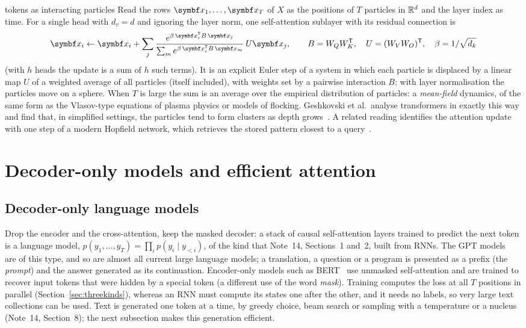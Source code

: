 \documentclass[11pt]{article}
\begin{document}
\begin{physics}{tokens as interacting particles}
Read the rows $\x_1, \dots, \x_T$ of $X$ as the positions of $T$ particles in $\mathbb{R}^d$ and the layer index as time. For a
single head with $d_v = d$ and ignoring the layer norm, one self-attention sublayer with its residual connection is
\[
  \x_i \gets \x_i + \sum_j \frac{e^{\beta\,\x_i\T B\,\x_j}}{\sum_m e^{\beta\,\x_i\T B\,\x_m}}\, U\x_j ,
  \qquad B = W_QW_K\T, \quad U = (W_VW_O)\T, \quad \beta = 1/\sqrt{d_k}
\]
(with $h$ heads the update is a sum of $h$ such terms). It is an explicit Euler step of a system in which each particle is
displaced by a linear map $U$ of a weighted average of all particles (itself included), with weights set by a pairwise
interaction $B$; with layer normalisation the particles move on a sphere. When $T$ is large the sum is an average over the empirical distribution of particles: a
\emph{mean-field} dynamics, of the same form as the Vlasov-type equations of plasma physics or models of flocking.
Geshkovski et al.\ analyse transformers in exactly this way and find that, in simplified settings, the particles tend to
form clusters as depth grows~\cite{geshkovski2023}. A related reading identifies the attention update with one step of a
modern Hopfield network, which retrieves the stored pattern closest to a query~\cite{ramsauer2021}.
\end{physics}

\section{Decoder-only models and efficient attention}\label{sec:modern}

\subsection{Decoder-only language models}\label{sec:decoderonly}

Drop the encoder and the cross-attention, keep the masked decoder: a stack of causal self-attention layers trained to
predict the next token is a language model, $p(y_1, \dots, y_T) = \prod_i p(y_i \mid y_{<i})$, of the kind that Note~14,
Sections~1 and~2, built from RNNs. The GPT models~\cite{radford2019,brown2020} are of this type, and so are almost all current large language models;
a translation, a question or a program is presented as a prefix (the \emph{prompt}) and the answer generated as its
continuation. Encoder-only models such as BERT~\cite{devlin2019} use unmasked self-attention and are trained to recover
input tokens that were hidden by a special token (a different use of the word \emph{mask}). Training computes the loss
at all $T$ positions in parallel (Section~\ref{sec:threekinds}), whereas an RNN must compute its states one after the
other, and it needs no labels, so very large text collections can be used. Text is generated one token at a time, by
greedy choice, beam search or sampling with a temperature or a nucleus (Note~14, Section~8); the next subsection makes
this generation efficient.
\end{document}
